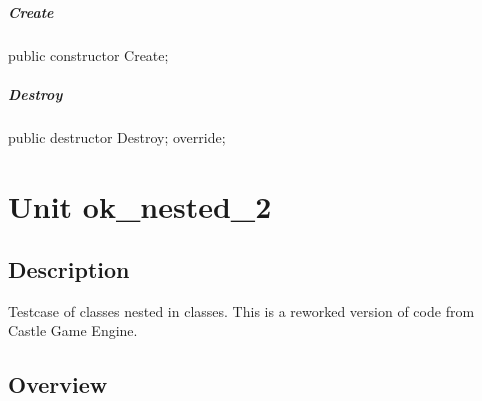 \documentclass{report}
\begin{document}
\paragraph*{Create}\hspace*{\fill}

\begin{list}{}{
\setlength{\itemindent}{0cm}
\setlength{\listparindent}{0cm}
\setlength{\leftmargin}{\evensidemargin}
\addtolength{\leftmargin}{\tmplength}
\settowidth{\labelsep}{X}
\addtolength{\leftmargin}{\labelsep}
\setlength{\labelwidth}{\tmplength}
}
\begin{flushleft}
\item[\textbf{Declaration}\hfill]
\begin{ttfamily}
public constructor Create;\end{ttfamily}


\end{flushleft}
\end{list}
\paragraph*{Destroy}\hspace*{\fill}

\begin{list}{}{
\setlength{\itemindent}{0cm}
\setlength{\listparindent}{0cm}
\setlength{\leftmargin}{\evensidemargin}
\addtolength{\leftmargin}{\tmplength}
\settowidth{\labelsep}{X}
\addtolength{\leftmargin}{\labelsep}
\setlength{\labelwidth}{\tmplength}
}
\begin{flushleft}
\item[\textbf{Declaration}\hfill]
\begin{ttfamily}
public destructor Destroy; override;\end{ttfamily}


\end{flushleft}
\end{list}
\chapter{Unit ok{\_}nested{\_}2}
\section{Description}
Testcase of classes nested in classes. This is a reworked version of code from Castle Game Engine.
\section{Overview}
\begin{description}
\item[\texttt{\begin{ttfamily}TCastleProfiler\end{ttfamily} Class}]
\end{description}
\end{document}
